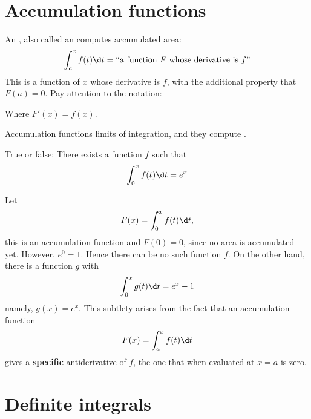 \documentclass{ximera}
\begin{document}
\section{Accumulation functions}

An , also called an 
computes accumulated area:
\[
\int_a^x f(t) \d t = \text{``a function $F$ whose derivative is $f$''}
\]
This is a function of $x$ whose derivative is $f$, with the additional
property that $F(a)=0$.  Pay attention to the notation:
\begin{image}
\end{image}
Where $F'(x) = f(x)$.
\begin{explanation}%
  Accumulation functions  limits of integration, and they compute
  .
\end{explanation}
\begin{question}
  True or false: There exists a function $f$ such that 
  \[
  \int_0^x f(t) \d t = e^x
  \]
  \begin{multipleChoice}
  \end{multipleChoice}
  \begin{feedback}
    Let
    \[
    F(x) = \int_0^x f(t) \d t,
    \]
    this is an accumulation function and $F(0) = 0$, since no area is
    accumulated yet. However, $e^0 =1$. Hence there can be no such
    function $f$. On the other hand, there is a function $g$ with
     \[
     \int_0^x g(t) \d t = e^x-1
     \]
     namely, $g(x) = e^x$. This subtlety arises from the fact that an
     accumulation function
     \[
     F(x) = \int_a^x f(t) \d t
     \]
     gives a \textbf{specific} antiderivative of $f$, the one that
     when evaluated at $x=a$ is zero.
  \end{feedback}
\end{question}










\section{Definite integrals}
\end{document}
